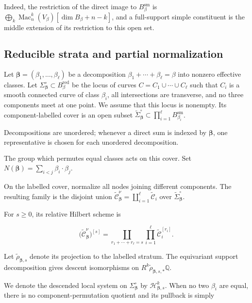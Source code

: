 \documentclass[11pt,reqno]{amsart}
\theoremstyle{definition}
\newcommand{\Q}{\mathbb Q}
\newcommand{\red}{\mathrm{red}}
\newcommand{\sm}{\mathrm{sm}}
\newcommand{\Mac}{\operatorname{Mac}}
\begin{document}
Indeed, the restriction of the direct image to $B_\beta^{\sm}$ is
$
\bigoplus_k\Mac_n^k(V_\beta)[\dim B_\beta+n-k]
$, and a full-support simple constituent is the middle extension of its
restriction to this open set.

\subsection{Reducible strata and partial normalization}

Let $\boldsymbol\beta=(\beta_1,\ldots,\beta_\ell)$ be a decomposition
$\beta_1+\cdots+\beta_\ell=\beta$ into nonzero effective classes.  Let
$\Sigma_{\boldsymbol\beta}^{\circ}\subset B_\beta^{\red}$ be the locus of
curves $C=C_1\cup\cdots\cup C_\ell$ such that $C_i$ is a smooth connected
curve of class $\beta_i$, all
intersections are transverse, and no three components meet at one point.  We
assume that this locus is nonempty.  Its component-labelled cover is an open
subset $\widetilde\Sigma_{\boldsymbol\beta}^{\circ}
\subset\prod_{i=1}^{\ell}B_{\beta_i}^{\sm}$.

Decompositions are unordered; whenever a direct sum is indexed by
$\boldsymbol\beta$, one representative is chosen for each unordered
decomposition.

The group which permutes equal classes acts on this cover.  Set
$N(\boldsymbol\beta)=\sum_{i<j}\beta_i\cdot\beta_j$.

On the labelled cover, normalize all nodes joining different components.
The resulting family is the disjoint union
$\widetilde{\mathcal C}_{\boldsymbol\beta}^{\nu}
=\coprod_{i=1}^{\ell}\widetilde{\mathcal C}_i$ over
$\widetilde\Sigma_{\boldsymbol\beta}^{\circ}$.

For $s\ge0$, its relative Hilbert scheme is

\begin{equation}\label{eq:partial-normalization-hilbert}
  \bigl(\widetilde{\mathcal C}_{\boldsymbol\beta}^{\nu}\bigr)^{[s]}
  =
  \coprod_{r_1+\cdots+r_\ell=s}
  \prod_{i=1}^{\ell}\widetilde{\mathcal C}_i^{[r_i]}.
\end{equation}

Let $\widetilde\rho_{\boldsymbol\beta,s}$ denote its projection to the
labelled stratum.  The equivariant support decomposition gives descent isomorphisms
on $R^k\widetilde\rho_{\boldsymbol\beta,s,*}\Q$.

We denote the descended local system on
$\Sigma_{\boldsymbol\beta}^{\circ}$ by
$\mathcal H_{\boldsymbol\beta,s}^k$.  When no two $\beta_i$ are equal,
there is no component-permutation quotient and its pullback is simply
\end{document}
